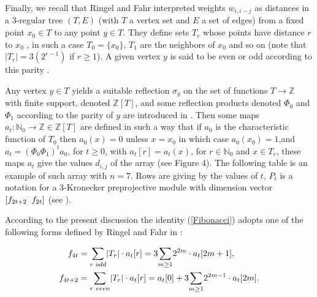 \documentclass[10pt,twoside]{article}
\theoremstyle{definition}
\begin{document}
Finally, we recall that Ringel and Fahr interpreted weights $w_{i, i-j}$ as distances in a 3-regular tree $(T,E)$ (with $T$ a vertex set and $E$ a set of edges) from a fixed point $x_{0}\in T$ to any point $y\in T$. They define sets $T_{r}$ whose points have distance $r$ to $x_{0}$ , in such a case $T_{0}=\{x_{0}\}$, $T_{1}$ are the neighbors of $x_{0}$ and so on (note that $|T_{r}|=3(2^{r-1})$ if $r\geq1$). A given vertex $y$ is said to be even or odd according to this parity \cite{Fahr1}.\par\bigskip
Any vertex $y\in T$ yields a suitable reflection $\sigma_{y}$ on
the set of functions $T\rightarrow \mathbb{Z}$ with finite support, denoted $\mathbb{Z}[T]$, and some reflection products denoted
$\Phi_{0}$ and $\Phi_{1}$ according to the parity of $y$ are introduced in \cite{Fahr1}. Then some maps
$a_{t}:\mathbb{N}_{0}\rightarrow \mathbb{Z}\in\mathbb{Z}[T]$ are defined in such a way that if $a_{0}$ is
the characteristic function of $T_{0}$ then $a_{0}(x)=0$ unless $x=x_{0}$ in which case $a_{0}(x_{0})=1$,\quad and\quad $a_{t}=(\Phi_{0}\Phi_{1})^{t}a_{0}$, for $t\geq0$, with $a_{t}[r]=a_{t}(x)$, for $r\in\mathbb{N}_{0}$ and $x\in T_{r}$, these maps $a_{t}$ give the values $d_{i, j}$ of the array (see Figure 4). The following table is an example of such array with $n=7$. Rows are giving by the values of $t$, $P_{t}$ is a notation for a 3-Kronecker preprojective module with dimension vector $[f_{2t+2}\hspace{0.2cm}f_{2t}]$  (see \cite{Fahr3}). \par\bigskip

According to the present discussion the identity (\ref{Fibonacci}) adopts one of the following forms defined by Ringel and Fahr in \cite{Fahr1}:

 \begin{equation}\label{Fibonacci2}
\begin{split}
f_{4t}&=\underset{r\hspace{0.1cm} odd}{{\sum}}|T_{r}|\cdot a_{t}[r]=3\underset{m\geq1}{{\sum}}2^{2m}\cdot a_{t}[2m+1],\\
f_{4t+2}&=\underset{r\hspace{0.1cm} even}{{\sum}}|T_{r}|\cdot a_{t}[r]=a_{t}[0]+3\underset{m\geq1}{{\sum}}2^{2m-1}\cdot a_{t}[2m].
\end{split}
\end{equation}
\end{document}
